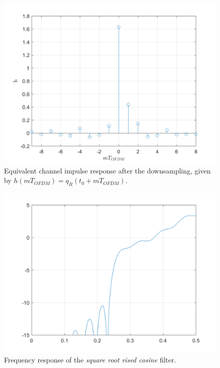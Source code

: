 \documentclass[a4paper, 12pt]{report}
\begin{document}
\begin{figure}[H]
	\centering
	\includegraphics[width=14cm]{h}
	\caption{Equivalent channel impulse response after the downsampling, given by $h(mT_{OFDM}) = q_R(t_0+mT_{OFDM})$.}
\end{figure}

\begin{figure}[H]
	\centering
	\includegraphics[width=14cm]{Q_r}
	\caption{Frequency response of the \textit{square root rised cosine} filter.}\label{}
\end{figure}
\end{document}
